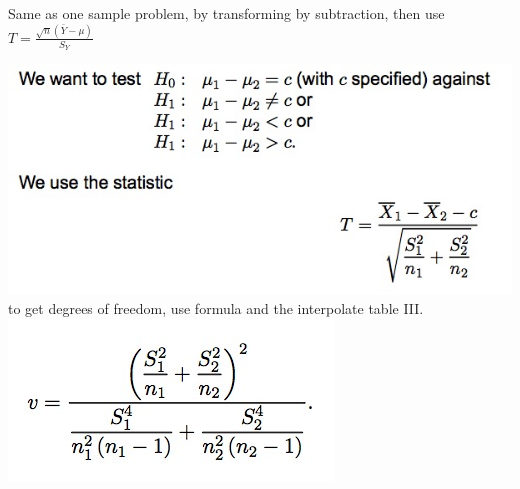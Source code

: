 \documentclass{examnotes}
\begin{document}
Same as one sample problem, by transforming by subtraction, then use $T=\displaystyle\frac{\sqrt{n}(\bar{Y}-\mu)}{S_Y}$

\includegraphics[scale=0.5]{./img/75.jpg}
to get degrees of freedom, use formula and the interpolate table III.
\includegraphics[scale=0.5]{./img/v.jpg}
\end{document}
